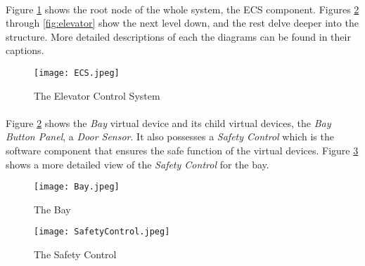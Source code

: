 \documentclass[12pt]{article}
\begin{document}
	
		\paragraph{} Figure \ref{fig:ecs} shows the root node of the whole system, the ECS component. Figures \ref{fig:bay} 
		through \ref{fig:elevator} show the next level down, and the rest delve deeper into the structure. More detailed descriptions
		of each the diagrams can be found in their captions.
		\begin{figure}[H]
  			\centerline{\texttt{[image: ECS.jpeg]}}
  			\caption{The Elevator Control System}
  			\label{fig:ecs}
		\end{figure}
	
		\paragraph{} Figure \ref{fig:bay} shows the \textit{Bay} virtual device and its child virtual devices, the \textit{Bay Button Panel}, 
		a \textit{Door Sensor}. It also possesses a \textit{Safety Control} which is the software component that ensures the safe function
		of the virtual devices. Figure \ref{fig:safetycontrol} shows a more detailed view of the \textit{Safety Control} for the bay.	
		\begin{figure}[H]
			\centerline{\texttt{[image: Bay.jpeg]}}
			\caption{The Bay}
			\label{fig:bay}
		\end{figure}
			\begin{figure}[H]
				\centerline{\texttt{[image: SafetyControl.jpeg]}}
				\caption{The Safety Control}
				\label{fig:safetycontrol}
			\end{figure}
	
\end{document}
